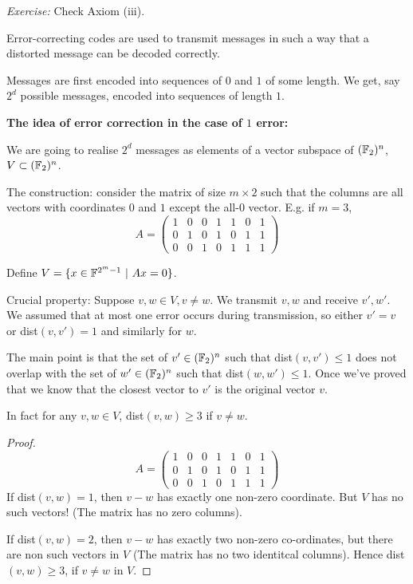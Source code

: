 \documentclass[10pt]{scrartcl}
\begin{document}
\emph{Exercise:} Check Axiom (iii). 


Error-correcting codes are used to transmit messages in such a way that a distorted message can be decoded correctly. 

Messages are first encoded into sequences of $0$ and $1$ of some length. We get, say $2^d$ possible messages, encoded into sequences of length $1$. 

\textbf{The idea of error correction in the case of $1$ error:}


We are going to realise $2^d$ messages as elements of a vector subspace of $(\mathbb{F}_2)^n$, $V \subset (\mathbb{F}_2)^n$. 

The construction: consider the matrix of size $m \times 2$ such that the columns are all vectors with coordinates $0$ and $1$ except the all-$0$ vector. E.g. if $m = 3$, 
\[
  A =\begin{pmatrix}
1 & 0 & 0 & 1 & 1 & 0 & 1\\
0 & 1 & 0 & 1 & 0 & 1 & 1\\
0 & 0 & 1 & 0 & 1 & 1 & 1 	
\end{pmatrix}
\]

Define $V = \{x \in \mathbb{F}^{2^m -1} ~|~ Ax = 0\}$. 

Crucial property: Suppose $v,w \in V, v \neq w$. We transmit $v,w$ and receive $v', w'$. We assumed that at most one error occurs during transmission, so either $v' = v$ or dist$(v,v') = 1$ and similarly for $w$. 

The main point is that the set of $v' \in (\mathbb{F}_2)^n$ such that dist$(v,v') \leq 1$ does not overlap with the set of $w' \in (\mathbb{F}_2)^n$ such that dist$(w,w') \leq 1$. Once we've proved that we know that the closest vector to $v'$ is the original vector $v$. 

In fact for any $v,w \in V$, dist$(v,w) \geq 3$ if $v\neq w$. 

\begin{proof}
	\[
  A =\begin{pmatrix}
1 & 0 & 0 & 1 & 1 & 0 & 1\\
0 & 1 & 0 & 1 & 0 & 1 & 1\\
0 & 0 & 1 & 0 & 1 & 1 & 1 	
\end{pmatrix}
\]
If dist$(v,w) = 1$, then $v-w$ has exactly one non-zero coordinate. But $V$ has no such vectors! (The matrix has no zero columns). 

If dist$(v,w) = 2$, then $v-w$ has exactly two non-zero co-ordinates, but there are non such vectors in $V$ (The matrix has no two identitcal columns). Hence dist$(v,w) \geq 3$, if $v \neq w$ in $V$. 
\end{proof}
\end{document}

